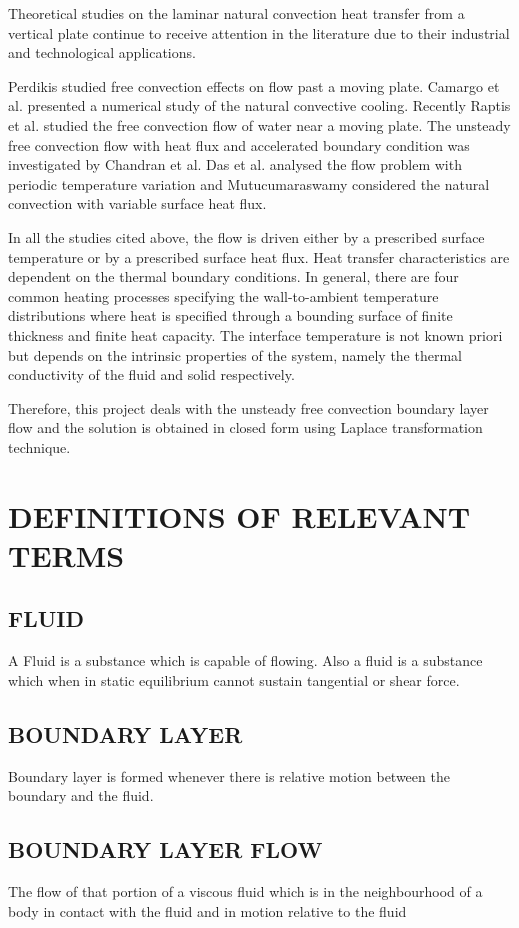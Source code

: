 \documentclass[11pt]{report}
\begin{document}
	Theoretical studies on the laminar natural convection heat transfer from a vertical plate continue to receive attention in the literature due to their industrial and technological applications.
	
	Perdikis studied free convection effects on flow past a moving plate. Camargo et al. presented a numerical study of the natural convective cooling. Recently Raptis et al. studied the free convection flow of water near a moving plate. The unsteady free convection flow with heat flux and accelerated boundary condition was investigated by Chandran et al. Das et al. analysed the flow problem with periodic temperature variation and Mutucumaraswamy considered the natural convection with variable surface heat flux.
	
	In all the studies cited above, the flow is driven either by a prescribed surface temperature or by a prescribed surface heat flux. Heat transfer characteristics are dependent on the thermal boundary conditions. In general, there are four common heating processes specifying the wall-to-ambient temperature distributions where heat is specified through a bounding surface of finite thickness and finite heat capacity. The interface temperature is not known priori but depends on the intrinsic properties of the system, namely the thermal conductivity of the fluid and solid respectively.
	
	Therefore, this project deals with the unsteady free convection boundary layer flow and the solution is obtained in closed form using Laplace transformation technique.
	
	
	\section{DEFINITIONS OF RELEVANT TERMS}
	
	\subsection{FLUID}
	A Fluid is a substance which is capable of flowing. Also a fluid is a substance which when in static equilibrium cannot sustain tangential or shear force.
	
	\subsection{BOUNDARY LAYER}
	Boundary layer is formed whenever there is relative motion between the boundary and the fluid.
	
	\subsection{BOUNDARY LAYER FLOW}
	The flow of that portion of a viscous fluid which is in the neighbourhood of a body in contact with the fluid and in motion relative to the fluid
	
\end{document}
